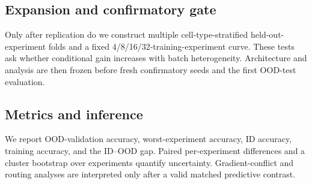 \subsection{Expansion and confirmatory gate}
Only after replication do we construct multiple cell-type-stratified held-out-experiment folds and
a fixed 4/8/16/32-training-experiment curve. These tests ask whether conditional gain increases
with batch heterogeneity. Architecture and analysis are then frozen before fresh confirmatory seeds
and the first OOD-test evaluation.

\subsection{Metrics and inference}
We report OOD-validation accuracy, worst-experiment accuracy, ID accuracy, training accuracy, and
the ID--OOD gap. Paired per-experiment differences and a cluster bootstrap over experiments quantify
uncertainty. Gradient-conflict and routing analyses are interpreted only after a valid matched
predictive contrast.

